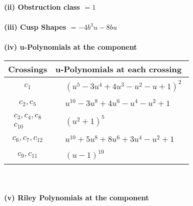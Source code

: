 \documentclass[1p]{elsarticle_modified}
\theoremstyle{definition}
\begin{document}
\flushleft \textbf{(ii) Obstruction class $= 1$}\\~\\
\flushleft \textbf{(iii) Cusp Shapes $= -4 b^3 u-8 b u$}\\~\\
\newpage\renewcommand{\arraystretch}{1}
\flushleft \textbf{(iv) u-Polynomials at the component}\newline \\
\begin{tabular}{m{50pt}|m{274pt}}
Crossings & \hspace{64pt}u-Polynomials at each crossing \\
\hline $$\begin{aligned}c_{1}\end{aligned}$$&$\begin{aligned}
&(u^5-3 u^4+4 u^3- u^2- u+1)^2
\end{aligned}$\\
\hline $$\begin{aligned}c_{2},c_{5}\end{aligned}$$&$\begin{aligned}
&u^{10}-3 u^8+4 u^6- u^4- u^2+1
\end{aligned}$\\
\hline $$\begin{aligned}c_{3},c_{4},c_{8}\\c_{10}\end{aligned}$$&$\begin{aligned}
&(u^2+1)^5
\end{aligned}$\\
\hline $$\begin{aligned}c_{6},c_{7},c_{12}\end{aligned}$$&$\begin{aligned}
&u^{10}+5 u^8+8 u^6+3 u^4- u^2+1
\end{aligned}$\\
\hline $$\begin{aligned}c_{9},c_{11}\end{aligned}$$&$\begin{aligned}
&(u-1)^{10}
\end{aligned}$\\
\hline
\end{tabular}\\~\\
\newpage\renewcommand{\arraystretch}{1}
\flushleft \textbf{(v) Riley Polynomials at the component}\newline \\
\end{document}
